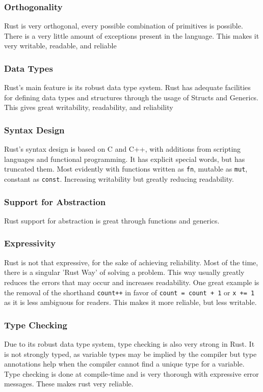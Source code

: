 \documentclass{article}
\newcommand{\rustin}[1]{\texttt{#1}}
\begin{document}
  \subsubsection{Orthogonality}
  Rust is very orthogonal, every possible combination of primitives is possible.
  There is a very little amount of exceptions present in the language. This
  makes it very writable, readable, and reliable

  \subsubsection{Data Types}
  Rust's main feature is its robust data type system. Rust has adequate
  facilities for defining data types and structures through the usage of Structs
  and Generics. This gives great writability, readability, and reliability

  \subsubsection{Syntax Design}
  Rust's syntax design is based on C and C++, with additions from scripting
  languages and functional programming. It has explicit special words, but has
  truncated them. Most evidently with functions written as \rustin{fn}, mutable
  as \rustin{mut}, constant as \rustin{const}. Increasing writability but
  greatly reducing readability.

  \subsubsection{Support for Abstraction}
  Rust support for abstraction is great through functions and generics.

  \subsubsection{Expressivity}
  Rust is not that expressive, for the sake of achieving reliability. Most of
  the time, there is a singular 'Rust Way' of solving a problem. This way
  usually greatly reduces the errors that may occur and increases readability.
  One great example is the removal of the shorthand \texttt{count++} in
  favor of \rustin{count = count + 1} or \rustin{x += 1} as it is less ambiguous
  for readers. This makes it more reliable, but less writable.


  \subsubsection{Type Checking}
  Due to its robust data type system, type checking is also very strong in Rust.
  It is not strongly typed, as variable types may be implied by the compiler but
  type annotations help when the compiler cannot find a unique type for a
  variable. Type checking is done at compile-time and is very thorough with
  expressive error messages. These makes rust very reliable.
\end{document}
